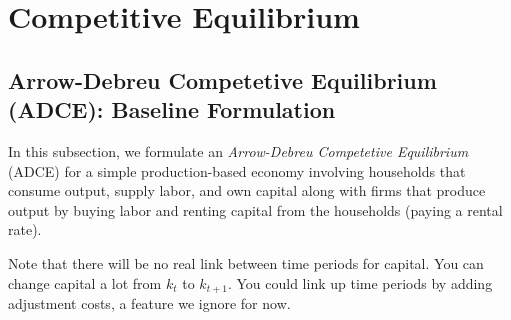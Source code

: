 \documentclass[12pt]{article}
\theoremstyle{plain}
\theoremstyle{definition}
\theoremstyle{remark}
\begin{document}
\clearpage
\section{Competitive Equilibrium}

\subsection{Arrow-Debreu Competetive Equilibrium (ADCE): Baseline
Formulation}

In this subsection, we formulate an
\emph{Arrow-Debreu Competetive Equilibrium} (ADCE) for a simple
production-based economy involving households that consume output,
supply labor, and own capital along with firms that produce output by
buying labor and renting capital from the households (paying a rental
rate).

Note that there will be no real link between time periods for capital.
You can change capital a lot from $k_t$ to $k_{t+1}$. You could link up
time periods by adding adjustment costs, a feature we ignore for now.
\end{document}
